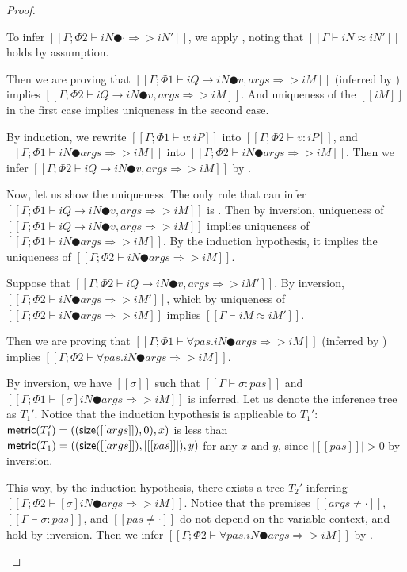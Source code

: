 \begin{proof}
\begin{caseof}
            To infer $[[Γ ; Φ2 ⊢ iN ● · ⇒> iN']]$, 
            we apply , noting that 
            $[[Γ ⊢ iN ≈ iN']]$ holds by assumption.

        \item {}
            Then we are proving that 
            $[[Γ ; Φ1 ⊢ iQ → iN ● v, args ⇒> iM]]$ (inferred by )
            implies $[[Γ ; Φ2 ⊢ iQ → iN ● v, args ⇒> iM]]$.
            And uniqueness of the $[[iM]]$ in the first case implies uniqueness in the second case.

            By induction, we rewrite $[[Γ ; Φ1 ⊢ v : iP]]$ into $[[Γ ; Φ2 ⊢ v : iP]]$, 
            and $[[Γ ; Φ1 ⊢ iN ● args ⇒> iM]]$ into $[[Γ ; Φ2 ⊢ iN ● args ⇒> iM]]$.
            Then we infer $[[Γ ; Φ2 ⊢ iQ → iN ● v, args ⇒> iM]]$ by .

            Now, let us show the uniqueness.
            The only rule that can infer $[[Γ ; Φ1 ⊢ iQ → iN ● v, args ⇒> iM]]$
            is .
            Then by inversion, 
            uniqueness of $[[Γ ; Φ1 ⊢ iQ → iN ● v, args ⇒> iM]]$ implies
            uniqueness of $[[Γ ; Φ1 ⊢ iN ● args ⇒> iM]]$. By 
            the induction hypothesis, it implies the uniqueness of 
            $[[Γ ; Φ2 ⊢ iN ● args ⇒> iM]]$.


            Suppose that 
            $[[Γ ; Φ2 ⊢ iQ → iN ● v, args ⇒> iM']]$.
            By inversion, $[[Γ ; Φ2 ⊢ iN ● args ⇒> iM']]$, 
            which by uniqueness of $[[Γ ; Φ2 ⊢ iN ● args ⇒> iM]]$ implies
            $[[Γ ⊢ iM ≈ iM']]$.

        \item {}
            Then we are proving that
            $[[Γ ; Φ1 ⊢ ∀pas.iN ● args ⇒> iM]]$ (inferred by )
            implies $[[Γ ; Φ2 ⊢ ∀pas.iN ● args ⇒> iM]]$.

            By inversion, we have $[[σ]]$ such that $[[Γ ⊢ σ :{pas}]]$ and
            $[[Γ ; Φ1 ⊢ [σ]iN ● args ⇒> iM]]$ is inferred.
            Let us denote the inference tree as $T_1'$.
            Notice that the induction hypothesis is applicable to $T_1'$:
            $\mathsf{metric}(T_1') = ((\mathsf{size}([[args]]), 0), x)$ is less than 
            $\mathsf{metric}(T_1) = ((\mathsf{size}([[args]]), |[[pas]]|), y)$ for any $x$ and $y$,
            since $|[[pas]]| > 0$ by inversion.

            This way, by the induction hypothesis, 
            there exists a tree $T_2'$ inferring
            $[[Γ ; Φ2 ⊢ [σ]iN ● args ⇒> iM]]$.
            Notice that the premises $[[args ≠ ·]]$, $[[Γ ⊢ σ :{pas}]]$,
            and $[[pas ≠ ·]]$ do not depend on the variable context,
            and hold by inversion.
            Then we infer $[[Γ ; Φ2 ⊢ ∀pas.iN ● args ⇒> iM]]$ by .
    \end{caseof}
\end{proof}